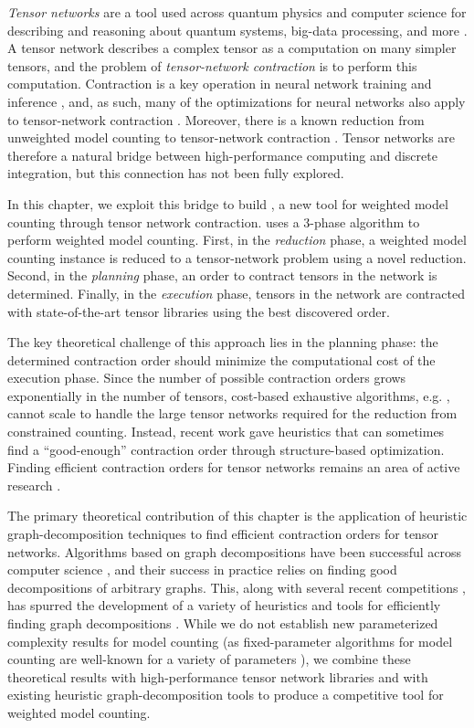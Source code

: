 \emph{Tensor networks} are a tool used across quantum physics and computer science for describing and reasoning about quantum systems, big-data processing, and more \cite{BB17,Cichocki14,Orus19}.
A tensor network describes a complex tensor as a computation on many simpler tensors, and the problem of \emph{tensor-network contraction} is to perform this computation. 
Contraction is a key operation in neural network training and inference \cite{BK07,Hirata03,KKCLA17,VZTGDMVAC18}, and, as such, many of the optimizations for neural networks also apply to tensor-network contraction \cite{KSTKPPRS19,NRBHHJN15,RMGZFZHVL19}.
Moreover, there is a known reduction from unweighted model counting to tensor-network contraction \cite{BMT15}.
Tensor networks are therefore a natural bridge between high-performance computing and discrete integration, but this connection has not been fully explored.

In this chapter, we exploit this bridge to build , a new tool for weighted model counting through tensor network contraction.  uses a 3-phase algorithm to perform weighted model counting. First, in the \emph{reduction} phase, a weighted model counting instance is reduced to a tensor-network problem using a novel reduction. Second, in the \emph{planning} phase, an order to contract tensors in the network is determined. Finally, in the \emph{execution} phase, tensors in the network are contracted with state-of-the-art tensor libraries using the best discovered order.

The key theoretical challenge of this approach lies in the planning phase: the determined contraction order should minimize the computational cost of the execution phase. Since the number of possible contraction orders grows exponentially in the number of tensors, cost-based exhaustive algorithms, e.g. \cite{PHV14}, cannot scale to handle the large tensor networks required for the reduction from constrained counting. Instead, recent work \cite{KCMR18} gave heuristics that can sometimes find a ``good-enough'' contraction order through structure-based optimization. Finding efficient contraction orders for tensor networks remains an area of active research \cite{RTPCTSL19}.

The primary theoretical contribution of this chapter is the application of heuristic graph-decomposition techniques to find efficient contraction orders for tensor networks. Algorithms based on graph decompositions have been successful across computer science \cite{GLST17,MPPV04}, and their success in practice relies on finding good decompositions of arbitrary graphs. This, along with several recent competitions \cite{DKTW18}, has spurred the development of a variety of heuristics and tools for efficiently finding graph decompositions \cite{AMW17,HS18,Tamaki17}. While we do not establish new parameterized complexity results for model counting (as fixed-parameter algorithms for model counting are well-known for a variety of parameters \cite{FMR08,SS10}), we combine these theoretical results with high-performance tensor network libraries and with existing heuristic graph-decomposition tools to produce a competitive tool for weighted model counting.

